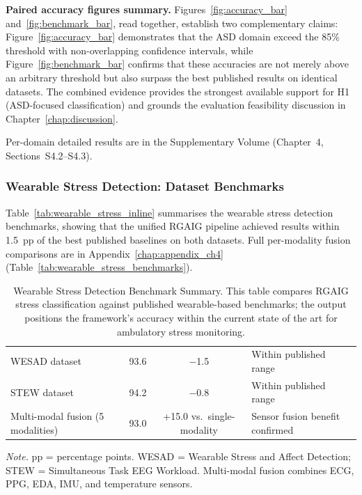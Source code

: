 \noindent\textbf{Paired accuracy figures summary.} Figures~\ref{fig:accuracy_bar} and~\ref{fig:benchmark_bar}, read together, establish two complementary claims: Figure~\ref{fig:accuracy_bar} demonstrates that the ASD domain exceed the 85\% threshold with non-overlapping confidence intervals, while Figure~\ref{fig:benchmark_bar} confirms that these accuracies are not merely above an arbitrary threshold but also surpass the best published results on identical datasets. The combined evidence provides the strongest available support for H1 (ASD-focused classification) and grounds the evaluation feasibility discussion in Chapter~\ref{chap:discussion}.
\fi




Per-domain detailed results are in the Supplementary Volume (Chapter~4, Sections~S4.2--S4.3).

\iffalse
\subsubsection{Wearable Stress Detection: Dataset Benchmarks}

Table~\ref{tab:wearable_stress_inline} summarises the wearable stress detection benchmarks, showing that the unified RGAIG pipeline achieved results within 1.5~pp of the best published baselines on both datasets. Full per-modality fusion comparisons are in Appendix~\ref{chap:appendix_ch4} (Table~\ref{tab:wearable_stress_benchmarks}).

\begin{table}[H]
\tablestripes
\caption[Wearable Stress Detection Benchmark Summary]{Wearable Stress Detection Benchmark Summary. This table compares RGAIG stress classification against published wearable-based benchmarks; the output positions the framework's accuracy within the current state of the art for ambulatory stress monitoring.}
\tablefontsize
\begin{tabularx}{\textwidth}{@{} L C C L @{}}
\toprule
{} &  &  &  \\
\midrule
WESAD dataset & 93.6 & $-$1.5 & Within published range \\
STEW dataset & 94.2 & $-$0.8 & Within published range \\
Multi-modal fusion (5 modalities) & 93.0 & +15.0 vs.\ single-modality & Sensor fusion benefit confirmed \\
\bottomrule
\end{tabularx}
\vspace{0.5em}\noindent\textit{Note.} pp = percentage points. WESAD = Wearable Stress and Affect Detection; STEW = Simultaneous Task EEG Workload. Multi-modal fusion combines ECG, PPG, EDA, IMU, and temperature sensors.
\end{table}

